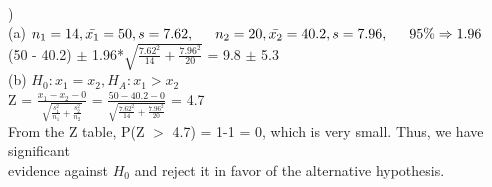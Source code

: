 \documentclass[12pt]{article}
\begin{document}
\noindent \hrulefill \\


) \\
\indent (a) $n_1 = 14, \bar{x_1} = 50, s = 7.62, \indent n_2 = 20, \bar{x_2} = 40.2, s = 7.96, \indent 95\% \Rightarrow 1.96$\\
\indent \indent (50 - 40.2) $\pm$ 1.96*{\Large $\sqrt{\frac{7.62^2}{14} + \frac{7.96^2}{20}}$} = 9.8 $\pm$ 5.3\\[.4em]
\indent (b) $H_0 : x_1 = x_2, H_A : x_1 > x_2 $\\[.4em]
\indent \indent Z = {\Large $\frac{x_1 - x_2 - 0}{\sqrt{\frac{s_1^2}{n_1}+\frac{s_2^2}{n_2}}}$ } = {\Large $\frac{50 - 40.2 - 0}{\sqrt{\frac{7.62^2}{14}+\frac{7.96^2}{20}}}$ } = 4.7\\[.4em]
\indent \indent From the Z table, P(Z $>$ 4.7) = 1-1 = 0, which is very small. Thus, we have significant\\
\indent \indent evidence against $H_0$ and reject it in favor of the alternative hypothesis.\\
\end{document}
